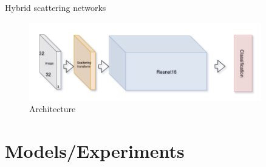 \documentclass[compress]{beamer}
\begin{document}
	\begin{frame}{Hybrid scattering networks}
		\begin{figure}
			\includegraphics[width=0.9\textwidth]{images/arch_hybrid_scattering_CIFAR10.png}
			\caption{Architecture}
		\end{figure}
	\end{frame}
	\section{Models/Experiments}
\end{document}
